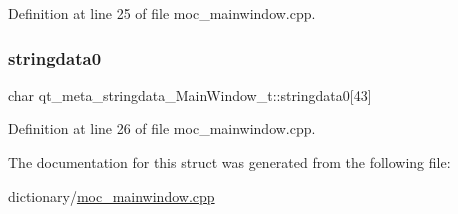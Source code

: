 Definition at line 25 of file moc\+\_\+mainwindow.\+cpp.

\mbox{\label{structqt__meta__stringdata___main_window__t_af7bc4685461b0d13618119dbb90593d5}} 
\subsubsection{\texorpdfstring{stringdata0}{stringdata0}}
{\footnotesize\ttfamily char qt\+\_\+meta\+\_\+stringdata\+\_\+\+Main\+Window\+\_\+t\+::stringdata0\mbox{[}43\mbox{]}}



Definition at line 26 of file moc\+\_\+mainwindow.\+cpp.



The documentation for this struct was generated from the following file\+:\begin{DoxyCompactItemize}
\item 
dictionary/\hyperlink{moc__mainwindow_8cpp}{moc\+\_\+mainwindow.\+cpp}\end{DoxyCompactItemize}
